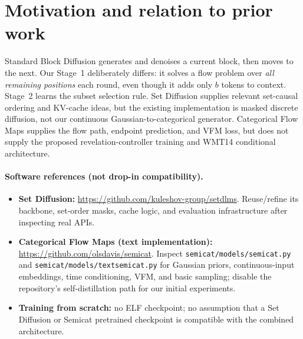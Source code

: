 \documentclass[11pt,a4paper]{article}
\begin{document}
\section{Motivation and relation to prior work}
Standard Block Diffusion generates and denoises a current block, then moves to the next. Our Stage~1 deliberately differs: it solves a flow problem over \emph{all remaining positions} each round, even though it adds only $b$ tokens to context. Stage~2 learns the subset selection rule. Set Diffusion \cite{arriola2026} supplies relevant set-causal ordering and KV-cache ideas, but the existing implementation is masked discrete diffusion, not our continuous Gaussian-to-categorical generator. Categorical Flow Maps \cite{roos2026} supplies the flow path, endpoint prediction, and VFM loss, but does not supply the proposed revelation-controller training and WMT14 conditional architecture.

\paragraph{Software references (not drop-in compatibility).}
\begin{itemize}
\item \textbf{Set Diffusion:} \url{https://github.com/kuleshov-group/setdlms}. Reuse/refine its backbone, set-order masks, cache logic, and evaluation infrastructure after inspecting real APIs.
\item \textbf{Categorical Flow Maps (text implementation):} \url{https://github.com/olsdavis/semicat}. Inspect \texttt{semicat/models/semicat.py} and \texttt{semicat/models/textsemicat.py} for Gaussian priors, continuous-input embeddings, time conditioning, VFM, and basic sampling; disable the repository's self-distillation path for our initial experiments.
\item \textbf{Training from scratch:} no ELF checkpoint; no assumption that a Set Diffusion or Semicat pretrained checkpoint is compatible with the combined architecture.
\end{itemize}
\end{document}
